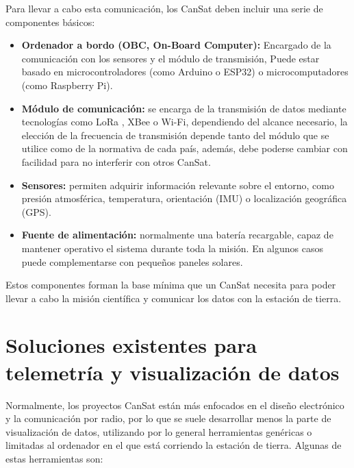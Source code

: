 Para llevar a cabo esta comunicación, los CanSat deben incluir una serie de componentes básicos:
\begin{itemize}
    \item \textbf{Ordenador a bordo (OBC, On-Board Computer):} Encargado de la comunicación con los sensores y el módulo de transmisión, Puede estar basado en microcontroladores (como Arduino o ESP32) o microcomputadores (como Raspberry Pi).
    \item \textbf{Módulo de comunicación:} se encarga de la transmisión de datos mediante tecnologías como LoRa \cite{lora2015overview}, XBee \cite{xbee} o Wi-Fi, dependiendo del alcance necesario,
    la elección de la frecuencia de transmisión depende tanto del módulo que se utilice como de la normativa de cada país, además, debe poderse cambiar con facilidad para no interferir con otros CanSat.
    \item \textbf{Sensores:} permiten adquirir información relevante sobre el entorno, como presión atmosférica, temperatura, orientación (IMU) o localización geográfica (GPS).
    \item \textbf{Fuente de alimentación:} normalmente una batería recargable, capaz de mantener operativo el sistema durante toda la misión. En algunos casos puede complementarse con pequeños paneles solares.
\end{itemize}

Estos componentes forman la base mínima que un CanSat necesita para poder llevar a cabo la misión científica y comunicar los datos con la estación de tierra.


\section{Soluciones existentes para telemetría y visualización de datos}
Normalmente, los proyectos CanSat están más enfocados en el diseño electrónico y la comunicación por radio,
por lo que se suele desarrollar menos la parte de visualización de datos, utilizando por lo general herramientas genéricas
o limitadas al ordenador en el que está corriendo la estación de tierra. Algunas de estas herramientas son:

